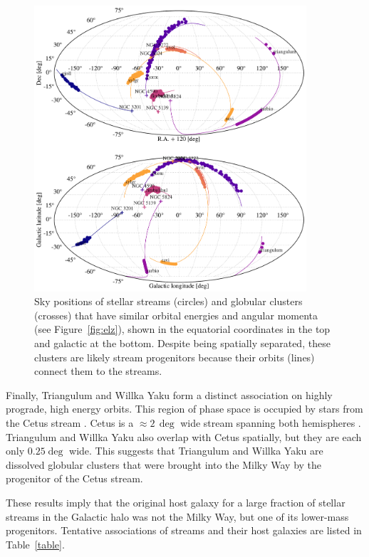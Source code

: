 \documentclass[twocolumn]{aastex63}
\begin{document}
\begin{figure}
\begin{center}
\includegraphics[width=0.9\textwidth]{sky_orbits.pdf}
\end{center}
\caption{
Sky positions of stellar streams (circles) and globular clusters (crosses) that have similar orbital energies and angular momenta (see Figure~\ref{fig:elz}), shown in the equatorial coordinates in the top and galactic at the bottom.
Despite being spatially separated, these clusters are likely stream progenitors because their orbits (lines) connect them to the streams.
}
\label{fig:sky}
\end{figure}

Finally, Triangulum and Willka Yaku form a distinct association on highly prograde, high energy orbits.
This region of phase space is occupied by stars from the Cetus stream \citep{yuan2019}.
Cetus is a $\approx2\,\deg$ wide stream spanning both hemispheres \citep[the southern portion of the stream was identified as the Palca overdensity]{newberg2009, chang2020}.
Triangulum and Willka Yaku also overlap with Cetus spatially, but they are each only $0.25\deg$ wide.
This suggests that Triangulum and Willka Yaku are dissolved globular clusters that were brought into the Milky Way by the progenitor of the Cetus stream.

These results imply that the original host galaxy for a large fraction of stellar streams in the Galactic halo was not the Milky Way, but one of its lower-mass progenitors.
Tentative associations of streams and their host galaxies are listed in Table~\ref{table}.
\end{document}
